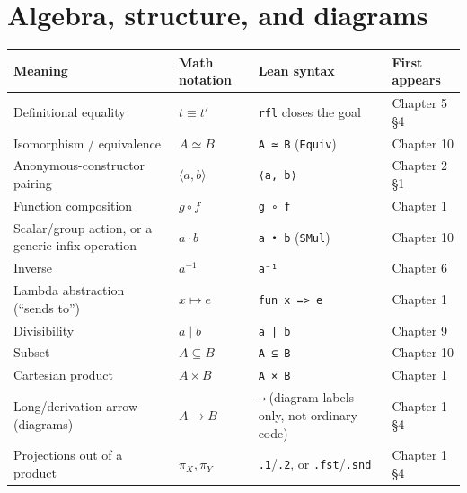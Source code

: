 \section{Algebra, structure, and diagrams}\label{sec:root:notation-reference:3}

{\small\begin{tabular}{
  >{\raggedright\arraybackslash}p{}
  >{\raggedright\arraybackslash}p{}
  >{\raggedright\arraybackslash}p{}
  >{\raggedright\arraybackslash}p{}
}
\toprule
Meaning & Math notation & Lean syntax & First appears \\
\midrule
Definitional equality & \(t \equiv t'\) & \texttt{rfl} closes the goal & Chapter 5 §4 \\
Isomorphism / equivalence & \(A \simeq B\) & \texttt{A ≃ B} (\texttt{Equiv}) & Chapter 10 \\
Anonymous-constructor pairing & \(\langle a, b \rangle\) & \texttt{⟨a, b⟩} & Chapter 2 §1 \\
Function composition & \(g \circ f\) & \texttt{g ∘ f} & Chapter 1 \\
Scalar/group action, or a generic infix operation & \(a \cdot b\) & \texttt{a • b} (\texttt{SMul}) & Chapter 10 \\
Inverse & \(a^{-1}\) & \texttt{a⁻¹} & Chapter 6 \\
Lambda abstraction (``sends to'') & \(x \mapsto e\) & \texttt{fun x => e} & Chapter 1 \\
Divisibility & \(a \mid b\) & \texttt{a ∣ b} & Chapter 9 \\
Subset & \(A \subseteq B\) & \texttt{A ⊆ B} & Chapter 10 \\
Cartesian product & \(A \times B\) & \texttt{A × B} & Chapter 1 \\
Long/derivation arrow (diagrams) & \(A \longrightarrow B\) & \texttt{⟶} (diagram labels only, not ordinary code) & Chapter 1 §4 \\
Projections out of a product & \(\pi_X, \pi_Y\) & \texttt{.1}/\texttt{.2}, or \texttt{.fst}/\texttt{.snd} & Chapter 1 §4 \\
\bottomrule
\end{tabular}}

